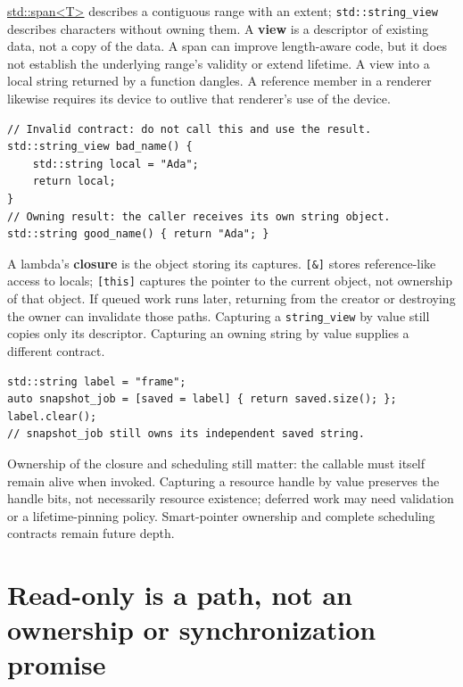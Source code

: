 \hyperref[appendix-aea529eb5175]{std::span\textless T\textgreater{}} describes a contiguous range with an extent; \texttt{std::string\_view} describes characters without owning them. A \textbf{view} is a descriptor of existing data, not a copy of the data. A span can improve length-aware code, but it does not establish the underlying range's validity or extend lifetime. A view into a local string returned by a function dangles. A reference member in a renderer likewise requires its device to outlive that renderer's use of the device.

\begin{verbatim}
// Invalid contract: do not call this and use the result.
std::string_view bad_name() {
    std::string local = "Ada";
    return local;
}
// Owning result: the caller receives its own string object.
std::string good_name() { return "Ada"; }
\end{verbatim}

A lambda's \textbf{closure} is the object storing its captures. \texttt{{[}\&{]}} stores reference-like access to locals; \texttt{{[}this{]}} captures the pointer to the current object, not ownership of that object. If queued work runs later, returning from the creator or destroying the owner can invalidate those paths. Capturing a \texttt{string\_view} by value still copies only its descriptor. Capturing an owning string by value supplies a different contract.

\begin{verbatim}
std::string label = "frame";
auto snapshot_job = [saved = label] { return saved.size(); };
label.clear();
// snapshot_job still owns its independent saved string.
\end{verbatim}

Ownership of the closure and scheduling still matter: the callable must itself remain alive when invoked. Capturing a resource handle by value preserves the handle bits, not necessarily resource existence; deferred work may need validation or a lifetime-pinning policy. Smart-pointer ownership and complete scheduling contracts remain future depth.

\section{Read-only is a path, not an ownership or synchronization promise}\label{01-foundations-i-ch003-read-only-is-a-path-not-an-ownership-or-synchronization-promise}

\hypertarget{01-foundations-i-ch003-read-only-is-a-path-not-an-ownership-or-synchronization-promise}{}

